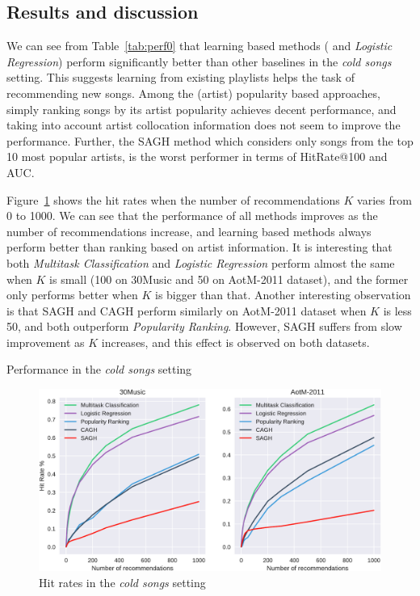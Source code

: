 \subsection{Results and discussion}

We can see from Table~\ref{tab:perf0} that learning based methods (
and {\it Logistic Regression}) perform significantly better than other baselines in the \emph{cold songs} setting.
This suggests learning from existing playlists helps the task of recommending new songs.
Among the (artist) popularity based approaches, 
simply ranking songs by its artist popularity achieves decent performance,
and taking into account artist collocation information does not seem to improve the performance.
Further, the SAGH method which considers only songs from the top 10 most popular artists,
is the worst performer in terms of HitRate@100 and AUC.

Figure~\ref{fig:hr0} shows the hit rates when the number of recommendations $K$ varies from 0 to 1000.
We can see that the performance of all methods improves as the number of recommendations increase,
and learning based methods always perform better than ranking based on artist information.
It is interesting that both {\it Multitask Classification} and {\it Logistic Regression} perform 
almost the same when $K$ is small (100 on 30Music and 50 on AotM-2011 dataset), 
and the former only performs better when $K$ is bigger than that.
Another interesting observation is that SAGH and CAGH perform similarly on AotM-2011 dataset when $K$
is less 50, and both outperform {\it Popularity Ranking}. However, SAGH suffers from slow improvement
as $K$ increases, and this effect is observed on both datasets.


\begin{table}[h]
\centering
\caption{Performance in the \emph{cold songs} setting}
\label{tab:perf0}
\resizebox{\columnwidth}{!}{

}
\end{table}

\begin{figure}[h]
\centering
\includegraphics[width=.975\linewidth]{fig/hitrate0.pdf}
\caption{Hit rates in the \emph{cold songs} setting}
\label{fig:hr0}
\end{figure}


